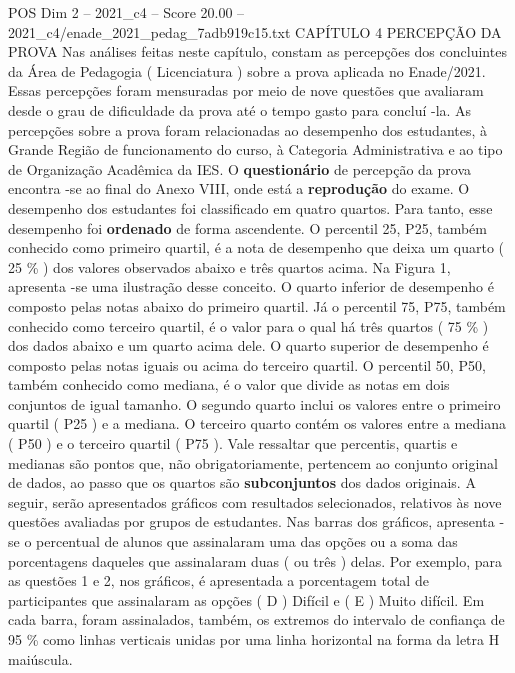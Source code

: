 \begin{textsample}{POS Dim 2 – 2021\_c4 – Score 20.00 – 2021\_c4/enade\_2021\_pedag\_7adb919c15.txt}  \label{ex:f2_pos_036}
CAPÍTULO 4 PERCEPÇÃO DA PROVA Nas análises feitas neste capítulo, constam as percepções dos concluintes da Área de Pedagogia ( Licenciatura ) sobre a prova aplicada no Enade/2021.
Essas percepções foram mensuradas por meio de nove questões que avaliaram desde o grau de dificuldade da prova até o tempo gasto para concluí -la.
As percepções sobre a prova foram relacionadas ao desempenho dos estudantes, à Grande Região de funcionamento do curso, à Categoria Administrativa e ao tipo de Organização Acadêmica da IES.
O \textbf{questionário} de percepção da prova encontra -se ao final do Anexo VIII, onde está a \textbf{reprodução} do exame.
O desempenho dos estudantes foi classificado em quatro quartos.
Para tanto, esse desempenho foi \textbf{ordenado} de forma ascendente.
O percentil 25, P25, também conhecido como primeiro quartil, é a nota de desempenho que deixa um quarto ( 25 \% ) dos valores observados abaixo e três quartos acima.
Na Figura 1, apresenta -se uma ilustração desse conceito.
O quarto inferior de desempenho é composto pelas notas abaixo do primeiro quartil.
Já o percentil 75, P75, também conhecido como terceiro quartil, é o valor para o qual há três quartos ( 75 \% ) dos dados abaixo e um quarto acima dele.
O quarto superior de desempenho é composto pelas notas iguais ou acima do terceiro quartil.
O percentil 50, P50, também conhecido como mediana, é o valor que divide as notas em dois conjuntos de igual tamanho.
O segundo quarto inclui os valores entre o primeiro quartil ( P25 ) e a mediana.
O terceiro quarto contém os valores entre a mediana ( P50 ) e o terceiro quartil ( P75 ).
Vale ressaltar que percentis, quartis e medianas são pontos que, não obrigatoriamente, pertencem ao conjunto original de dados, ao passo que os quartos são \textbf{subconjuntos} dos dados originais.
A seguir, serão apresentados gráficos com resultados selecionados, relativos às nove questões avaliadas por grupos de estudantes.
Nas barras dos gráficos, apresenta -se o percentual de alunos que assinalaram uma das opções ou a soma das porcentagens daqueles que assinalaram duas ( ou três ) delas.
Por exemplo, para as questões 1 e 2, nos gráficos, é apresentada a porcentagem total de participantes que assinalaram as opções ( D ) Difícil e ( E ) Muito difícil.
Em cada barra, foram assinalados, também, os extremos do intervalo de confiança de 95 \% como linhas verticais unidas por uma linha horizontal na forma da letra H maiúscula.

\end{textsample}
